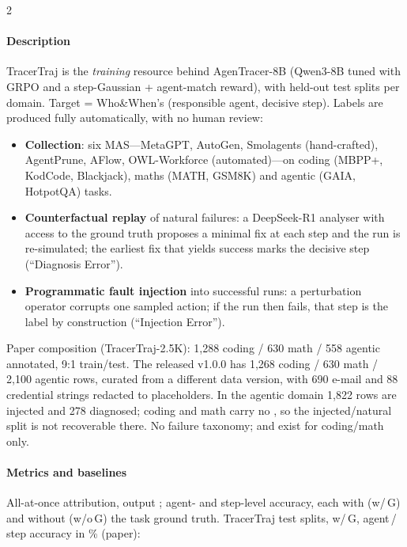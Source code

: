 \begin{multicols}{2}
\paragraph{Description} TracerTraj is the \emph{training} resource behind AgenTracer-8B (Qwen3-8B tuned with GRPO and a step-Gaussian + agent-match reward), with held-out test splits per domain. Target = Who\&When's (responsible agent, decisive step). Labels are produced fully automatically, with no human review:
\begin{itemize}
\item \textbf{Collection}: six MAS---MetaGPT, AutoGen, Smolagents (hand-crafted), AgentPrune, AFlow, OWL-Workforce (automated)---on coding (MBPP+, KodCode, Blackjack), maths (MATH, GSM8K) and agentic (GAIA, HotpotQA) tasks.
\item \textbf{Counterfactual replay} of natural failures: a DeepSeek-R1 analyser with access to the ground truth proposes a minimal fix at each step and the run is re-simulated; the earliest fix that yields success marks the decisive step (``Diagnosis Error'').
\item \textbf{Programmatic fault injection} into successful runs: a perturbation operator corrupts one sampled action; if the run then fails, that step is the label by construction (``Injection Error'').
\end{itemize}
Paper composition (TracerTraj-2.5K): 1,288 coding / 630 math / 558 agentic annotated, 9:1 train/test. The released v1.0.0 has 1,268 coding / 630 math / 2,100 agentic rows, curated from a different data version, with 690 e-mail and 88 credential strings redacted to placeholders. In the agentic domain 1,822 rows are injected and 278 diagnosed; coding and math carry no , so the injected/natural split is not recoverable there. No failure taxonomy;  and  exist for coding/math only.

\paragraph{Metrics and baselines} All-at-once attribution, output ; agent- and step-level accuracy, each with (w/\,G) and without (w/o\,G) the task ground truth. TracerTraj test splits, w/\,G, agent\,/\,step accuracy in \% (paper):


\end{multicols}
